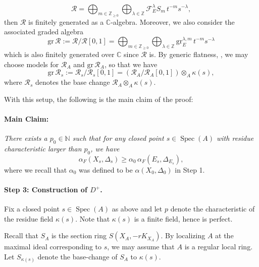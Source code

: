 \documentclass[11pt,reqno]{amsart}
\newcommand{\C}{\mathbb{C}}
\newcommand{\Z}{\mathbb{Z}}
\newcommand{\cR}{\mathcal{R}}
\newcommand{\bN}{\mathbb{N}}
\DeclareMathOperator{\Spec}{Spec}
\numberwithin{equation}{section}
\theoremstyle{definition}
\begin{document}
\begin{enumerate}
\[  \cR = \bigoplus_{m \in \Z_{\geq 0}} \bigoplus_{\lambda \in \Z} \mathscr{F}_{E} ^\lambda S_m \,  t^{-m} s^{-\lambda}, \]
then $\cR$ is finitely generated as a $\C$-algebra. Moreover, we also consider the associated graded algebra
\[  \text{gr} \, \cR := \cR / \cR[0, 1] =  \bigoplus_{m \in \Z_{\geq 0}} \bigoplus_{\lambda \in \Z} \text{gr}_{E} ^{\lambda,m} \,  t^{-m} s^{-\lambda}\]
which is also finitely generated over $\C$ since $\cR$ is. By generic flatness, \cite[\href{https://stacks.math.columbia.edu/tag/052A}{Tag 052A}]{stacks-project}, we may choose models for $\cR_A$ and $\text{gr} \, \cR _A$, so that we have
$$ \text{gr} \, \cR_s := \cR_s/ \cR_s [0,1] = ( \cR_A/ \cR_A[0,1]) \otimes_A \kappa(s), $$
where $\cR_s$ denotes the base change $\cR_A \otimes_A \kappa(s)$. 
    \end{enumerate}

\medskip





With this setup, the following is the main claim of the proof:
\medskip

\paragraph{\textbf{Main Claim:}} \textit{There exists a $p_0 \in \bN$ such that for any closed point $s \in \Spec(A)$ with residue characteristic larger than $p_0$, we have} 
\begin{equation} \label{equation:mainclaim}
\alpha_F (X_s, \Delta_s) \geq \alpha_0  \, \alpha_{F} (E_s, \Delta_{E_s}), \end{equation}   
where we recall that $\alpha_0$ was defined to be $\alpha(X_0, \Delta_0)$ in Step 1.
\bigskip

\paragraph{\textbf{Step 3: Construction of $D^+$.}} Fix a closed point $s \in \Spec(A)$ as above and let $p$ denote the characteristic of the residue field $\kappa(s)$. Note that $\kappa(s)$ is a finite field, hence is perfect.

Recall that $S_A$ is the section ring $S(X_A, -rK_{X_A})$. By localizing $A$ at the maximal ideal corresponding to $s$, we may assume that $A$ is a regular local ring. Let $S_{\kappa(s)}$ denote the base-change of $S_A$ to $\kappa(s)$.
\end{document}
